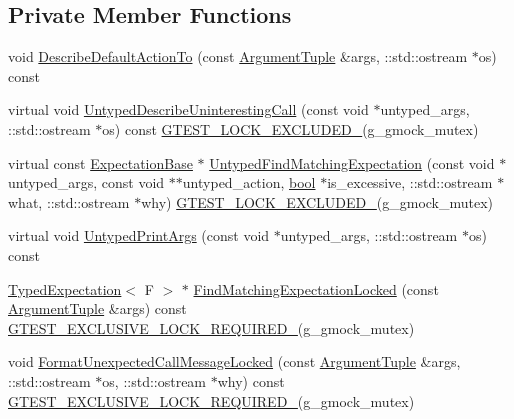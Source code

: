 \subsection*{Private Member Functions}
\begin{DoxyCompactItemize}
\item 
void \hyperlink{classtesting_1_1internal_1_1FunctionMockerBase_ac9f58631036d0507047e0088b829c237}{Describe\+Default\+Action\+To} (const \hyperlink{classtesting_1_1internal_1_1FunctionMockerBase_a336432a07e544af4ffb8103603471ca3}{Argument\+Tuple} \&args, \+::std\+::ostream $\ast$os) const
\item 
virtual void \hyperlink{classtesting_1_1internal_1_1FunctionMockerBase_a9f701bc2048925f61cab0491a9aa275c}{Untyped\+Describe\+Uninteresting\+Call} (const void $\ast$untyped\+\_\+args, \+::std\+::ostream $\ast$os) const \hyperlink{gtest-port_8h_a69abff5a4efdd07bd5faebe3dd318d06}{G\+T\+E\+S\+T\+\_\+\+L\+O\+C\+K\+\_\+\+E\+X\+C\+L\+U\+D\+E\+D\+\_\+}(g\+\_\+gmock\+\_\+mutex)
\item 
virtual const \hyperlink{classtesting_1_1internal_1_1ExpectationBase}{Expectation\+Base} $\ast$ \hyperlink{classtesting_1_1internal_1_1FunctionMockerBase_aa200995eb89574f8042ba6897d6cb98f}{Untyped\+Find\+Matching\+Expectation} (const void $\ast$untyped\+\_\+args, const void $\ast$$\ast$untyped\+\_\+action, \hyperlink{classbool}{bool} $\ast$is\+\_\+excessive, \+::std\+::ostream $\ast$what, \+::std\+::ostream $\ast$why) \hyperlink{gtest-port_8h_a69abff5a4efdd07bd5faebe3dd318d06}{G\+T\+E\+S\+T\+\_\+\+L\+O\+C\+K\+\_\+\+E\+X\+C\+L\+U\+D\+E\+D\+\_\+}(g\+\_\+gmock\+\_\+mutex)
\item 
virtual void \hyperlink{classtesting_1_1internal_1_1FunctionMockerBase_a6f77ce4fad16e1c8508fe6da71e8b930}{Untyped\+Print\+Args} (const void $\ast$untyped\+\_\+args, \+::std\+::ostream $\ast$os) const
\item 
\hyperlink{classtesting_1_1internal_1_1TypedExpectation}{Typed\+Expectation}$<$ F $>$ $\ast$ \hyperlink{classtesting_1_1internal_1_1FunctionMockerBase_a236b019bcbbfd13c0ed25aa34c1dd344}{Find\+Matching\+Expectation\+Locked} (const \hyperlink{classtesting_1_1internal_1_1FunctionMockerBase_a336432a07e544af4ffb8103603471ca3}{Argument\+Tuple} \&args) const \hyperlink{gtest-port_8h_a149f693bd59fa1bc937af54c0cdcb32f}{G\+T\+E\+S\+T\+\_\+\+E\+X\+C\+L\+U\+S\+I\+V\+E\+\_\+\+L\+O\+C\+K\+\_\+\+R\+E\+Q\+U\+I\+R\+E\+D\+\_\+}(g\+\_\+gmock\+\_\+mutex)
\item 
void \hyperlink{classtesting_1_1internal_1_1FunctionMockerBase_acfddf27974b9fe7cbe90c7e86cce4dcb}{Format\+Unexpected\+Call\+Message\+Locked} (const \hyperlink{classtesting_1_1internal_1_1FunctionMockerBase_a336432a07e544af4ffb8103603471ca3}{Argument\+Tuple} \&args, \+::std\+::ostream $\ast$os, \+::std\+::ostream $\ast$why) const \hyperlink{gtest-port_8h_a149f693bd59fa1bc937af54c0cdcb32f}{G\+T\+E\+S\+T\+\_\+\+E\+X\+C\+L\+U\+S\+I\+V\+E\+\_\+\+L\+O\+C\+K\+\_\+\+R\+E\+Q\+U\+I\+R\+E\+D\+\_\+}(g\+\_\+gmock\+\_\+mutex)
$$
\end{DoxyCompactItemize}
